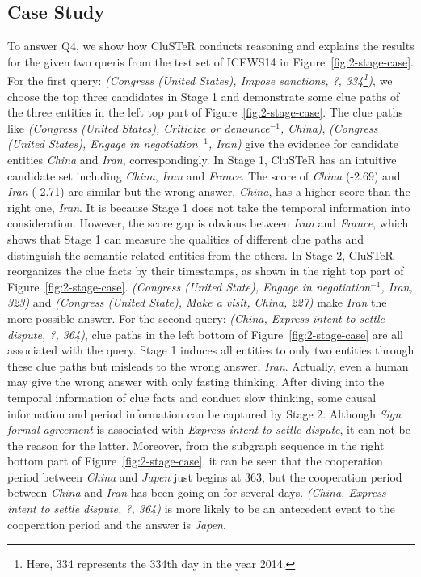\documentclass[11pt,a4paper]{article}
\begin{document}
\subsection{Case Study}
To answer Q4, we show how CluSTeR conducts reasoning and explains the
results for the given two queris from the test set of ICEWS14 in
Figure~\ref{fig:2-stage-case}. 
For the first query: \emph{(Congress (United
States), Impose sanctions, ?, 334\footnote{Here, 334 represents the 334th day in
the year 2014.})}, we choose the top three candidates in Stage 1 and demonstrate
some clue paths of the three entities in the left top part of
Figure~\ref{fig:2-stage-case}. 
The clue paths like \emph{(Congress (United
States), Criticize or denounce$^{-1}$, China)}, \emph{(Congress (United States),
Engage in negotiation$^{-1}$, Iran)} give the evidence for candidate entities
\emph{China} and \emph{Iran}, correspondingly. 
In Stage 1, CluSTeR has an intuitive candidate
set including \emph{China}, \emph{Iran} and \emph{France}. 
The score of \emph{China} (-2.69) and \emph{Iran}
(-2.71) are similar but the wrong answer, \emph{China}, has a higher score than the
right one, \emph{Iran}. 
It is because Stage 1 does not take the temporal information
into consideration. 
However, the score gap is obvious between \emph{Iran} and \emph{France},
which shows that Stage 1 can measure the qualities of different clue paths and
distinguish the semantic-related entities from the others. In Stage 2, CluSTeR
reorganizes the clue facts by their timestamps, as shown in the right top part
of Figure~\ref{fig:2-stage-case}. \emph{(Congress (United State), Engage in
negotiation$^{-1}$, Iran, 323)} and
\emph{(Congress (United State), Make a visit, China, 227)}
make \emph{Iran} the more possible answer. For the second query: \emph{(China, Express intent to settle dispute, ?, 364)},
clue paths in the left bottom of Figure~\ref{fig:2-stage-case} are all
associated with the query. Stage 1 induces all entities to only two entities
through these clue paths but misleads to the wrong answer, \emph{Iran}.
Actually, even a human may give the wrong answer with only fasting thinking.
After diving into the temporal information of clue facts and conduct slow
thinking, some causal information and period information can be captured by Stage 2. Although \emph{Sign formal agreement} is associated with \emph{Express intent to
settle dispute}, it can not be the reason for the latter. Moreover, from the
subgraph sequence in the right bottom part of Figure~\ref{fig:2-stage-case}, it
can be seen that the cooperation period between \emph{China} and \emph{Japen}
just begins at 363, but the cooperation period between \emph{China} and
\emph{Iran} has been going on for several days. \emph{(China, Express
intent to settle dispute, ?, 364)} is more likely to be an antecedent event to
the cooperation period and the answer is \emph{Japen}. 
\end{document}
